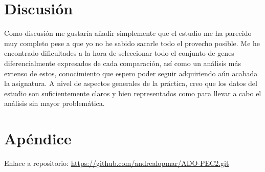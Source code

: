 \documentclass[
]{article}
\begin{document}
\newpage
\section{Discusión}

Como discusión me gustaría añadir simplemente que el estudio me ha
parecido muy completo pese a que yo no he sabido sacarle todo el
provecho posible. Me he encontrado dificultades a la hora de seleccionar
todo el conjunto de genes diferencialmente expresados de cada
comparación, así como un análisis más extenso de estos, conocimiento que
espero poder seguir adquiriendo aún acabada la asignatura. A nivel de
aspectos generales de la práctica, creo que los datos del estudio son
suficientemente claros y bien representados como para llevar a cabo el
análisis sin mayor problemática.

\newpage
\section{Apéndice}

Enlace a repositorio: \url{https://github.com/andrealopmar/ADO-PEC2.git}
\end{document}
